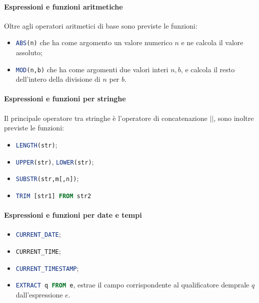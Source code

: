 \paragraph{Espressioni e funzioni aritmetiche}%
\label{par:Espressioni e funzioni aritmetiche}
Oltre agli operatori aritmetici di base sono previste le funzioni:
\begin{itemize}
  \item \lstinline[language=SQL]{ABS(n)} che ha come argomento un valore
    numerico $n$ e ne calcola il valore assoluto;
  \item \lstinline[language=SQL]{MOD(n,b)} che ha come argomenti due valori
    interi $n,b$, e calcola il resto dell'intero della divisione di $n$ per $b$.
\end{itemize}

\paragraph{Espressioni e funzioni per stringhe}%
\label{par:Espressioni e funzioni per stringhe}
Il principale operatore tra stringhe è l'operatore di concatenazione $||$, sono
inoltre previste le funzioni:
\begin{itemize}
  \item \lstinline[language=SQL]{LENGTH(str)};
  \item \lstinline[language=SQL]{UPPER(str)},
    \lstinline[language=SQL]{LOWER(str)};
  \item \lstinline[language=SQL]{SUBSTR(str,m[,n])};
  \item \lstinline[language=SQL]{TRIM [str1] FROM str2}
\end{itemize}

\paragraph{Espressioni e funzioni per date e tempi}%
\label{par:Espressioni e funzioni per date e tempi}
\begin{itemize}
  \item \lstinline[language=SQL]{CURRENT_DATE};
  \item \lstinline[language=SQL]{CURRENT_TIME};
  \item \lstinline[language=SQL]{CURRENT_TIMESTAMP};
  \item \lstinline[language=SQL]{EXTRACT q FROM e}, estrae il campo
    corrispondente al qualificatore demprale $q$ dall'espressione $e$.
\end{itemize}

